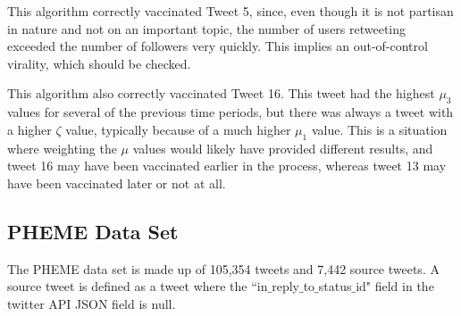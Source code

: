 \documentclass[preprint,review,12pt]{elsarticle}
\begin{document}
This algorithm correctly vaccinated Tweet 5, since, even though it is not partisan in nature and not on an important topic, the number of users retweeting exceeded the number of followers very quickly. This implies an out-of-control virality, which should be checked.

This algorithm also correctly vaccinated Tweet 16. This tweet had the highest $\mu_3$ values for several of the previous time periods, but there was always a tweet with a higher $\zeta$ value, typically because of a much higher $\mu_1$ value. This is a situation where weighting the $\mu$ values would likely have provided different results, and tweet 16 may have been vaccinated earlier in the process, whereas tweet 13 may have been vaccinated later or not at all. 



\subsection{PHEME Data Set}
The PHEME data set \cite{kochkina2018pheme} is made up of 105,354 tweets and 7,442 source tweets. A source tweet is defined as a tweet where the ``in$\_$reply$\_$to$\_$status$\_$id" field in the twitter API JSON field is null. 
\end{document}
